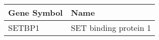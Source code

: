 \begin{tabular}{ll}
\toprule
Gene Symbol &                  Name \\
\midrule
     SETBP1 & SET binding protein 1 \\
\bottomrule
\end{tabular}
